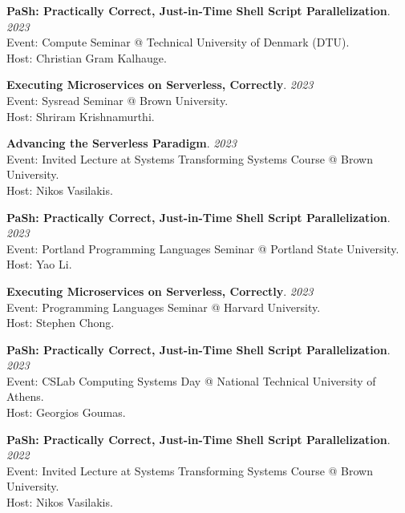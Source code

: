 \begin{minipage}{\textwidth}
\textbf{PaSh: Practically Correct, Just-in-Time Shell Script Parallelization}. \hfill {\em 2023}\\
Event: Compute Seminar @ Technical University of Denmark (DTU).\\
 Host: Christian Gram Kalhauge.
\end{minipage}

\begin{minipage}{\textwidth}
\textbf{Executing Microservices on Serverless, Correctly}. \hfill {\em 2023}\\
Event: Sysread Seminar @ Brown University.\\
 Host: Shriram Krishnamurthi.
\end{minipage}

\begin{minipage}{\textwidth}
\textbf{Advancing the Serverless Paradigm}. \hfill {\em 2023}\\
Event: Invited Lecture at Systems Transforming Systems Course @ Brown University.\\
 Host: Nikos Vasilakis.
\end{minipage}

\begin{minipage}{\textwidth}
\textbf{PaSh: Practically Correct, Just-in-Time Shell Script Parallelization}. \hfill {\em 2023}\\
Event: Portland Programming Languages Seminar @ Portland State University.\\
 Host: Yao Li.
\end{minipage}

\begin{minipage}{\textwidth}
\textbf{Executing Microservices on Serverless, Correctly}. \hfill {\em 2023}\\
Event: Programming Languages Seminar @ Harvard University.\\
 Host: Stephen Chong.
\end{minipage}

\begin{minipage}{\textwidth}
\textbf{PaSh: Practically Correct, Just-in-Time Shell Script Parallelization}. \hfill {\em 2023}\\
Event: CSLab Computing Systems Day @ National Technical University of Athens.\\
 Host: Georgios Goumas.
\end{minipage}

\begin{minipage}{\textwidth}
\textbf{PaSh: Practically Correct, Just-in-Time Shell Script Parallelization}. \hfill {\em 2022}\\
Event: Invited Lecture at Systems Transforming Systems Course @ Brown University.\\
 Host: Nikos Vasilakis.
\end{minipage}

